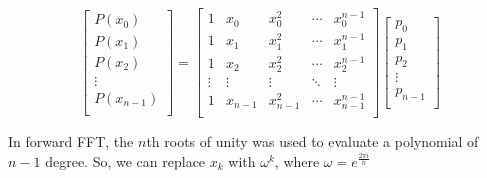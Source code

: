 \documentclass[28]{report}
\begin{document}
\begin{equation*}
	\begin{bmatrix}
					P(x_0) \\
				 P(x_1)\\
					P(x_2)\\
					\vdots \\
					P(x_{n-1}) \\
			\end{bmatrix}
			=
			\begin{bmatrix}
					1 & x_0 & x_0^2 & \cdots & x_0^{n-1} \\
					1 & x_1 & x_1^2 & \cdots & x_1^{n-1} \\
					1 & x_2 & x_2^2 & \cdots & x_2^{n-1} \\
					\vdots & \vdots & \vdots & \ddots & \vdots \\
					1 & x_{n-1} & x_{n-1}^2 & \cdots & x_{n-1}^{n-1} \\
			\end{bmatrix}
			\begin{bmatrix}
					p_0 \\
					p_1 \\
					p_2 \\
					\vdots \\
					p_{n-1} \\
			\end{bmatrix}
	\end{equation*}
\newline

In forward FFT, the $n$th roots of unity was used to evaluate a polynomial of $n-1$ degree. So, we can replace $x_k$ with $\omega^k$, where $\omega = e^{\frac{2\pi i}{n}}$
\end{document}
